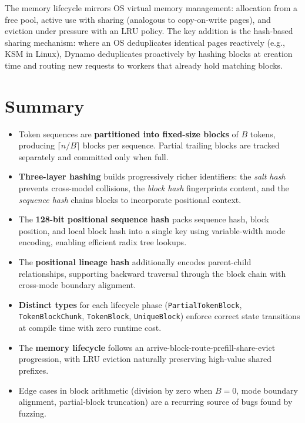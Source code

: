 \begin{insightbox}
The memory lifecycle mirrors OS virtual memory management: allocation from a free pool, active use with sharing (analogous to copy-on-write pages), and eviction under pressure with an LRU policy. The key addition is the hash-based sharing mechanism: where an OS deduplicates identical pages reactively (e.g., KSM in Linux), Dynamo deduplicates proactively by hashing blocks at creation time and routing new requests to workers that already hold matching blocks.
\end{insightbox}

\section{Summary}

\begin{itemize}
  \item Token sequences are \textbf{partitioned into fixed-size blocks} of $B$ tokens, producing $\lceil n/B \rceil$ blocks per sequence. Partial trailing blocks are tracked separately and committed only when full.
  \item \textbf{Three-layer hashing} builds progressively richer identifiers: the \emph{salt hash} prevents cross-model collisions, the \emph{block hash} fingerprints content, and the \emph{sequence hash} chains blocks to incorporate positional context.
  \item The \textbf{128-bit positional sequence hash} packs sequence hash, block position, and local block hash into a single key using variable-width mode encoding, enabling efficient radix tree lookups.
  \item The \textbf{positional lineage hash} additionally encodes parent-child relationships, supporting backward traversal through the block chain with cross-mode boundary alignment.
  \item \textbf{Distinct types} for each lifecycle phase (\texttt{PartialTokenBlock}, \texttt{TokenBlockChunk}, \texttt{TokenBlock}, \texttt{UniqueBlock}) enforce correct state transitions at compile time with zero runtime cost.
  \item The \textbf{memory lifecycle} follows an arrive-block-route-prefill-share-evict progression, with LRU eviction naturally preserving high-value shared prefixes.
  \item Edge cases in block arithmetic (division by zero when $B = 0$, mode boundary alignment, partial-block truncation) are a recurring source of bugs found by fuzzing.
\end{itemize}

